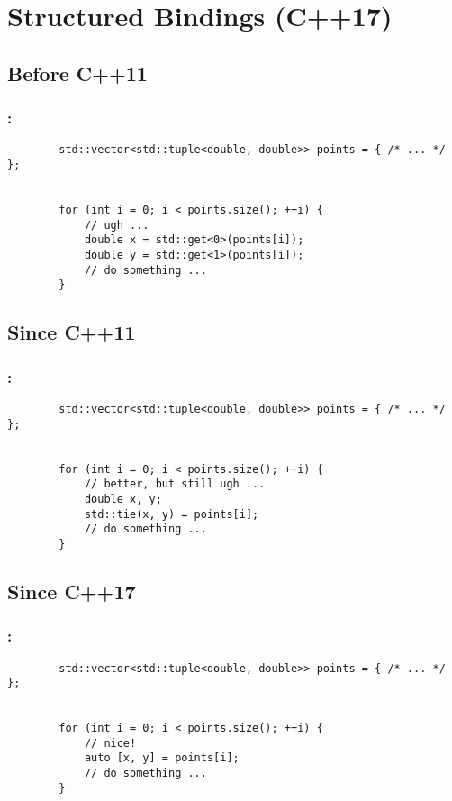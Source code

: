 \documentclass[aspectratio=43, t]{beamer}
\begin{document}
\section*{Structured Bindings (C++17)}
\subsection*{Before C++11}
\begin{frame}[fragile]
	\frametitle{\secname\footnotemark[1]{}: \subsecname}

	\begin{verbatim}
		std::vector<std::tuple<double, double>> points = { /* ... */ };


		for (int i = 0; i < points.size(); ++i) {
			// ugh ...
			double x = std::get<0>(points[i]);
			double y = std::get<1>(points[i]);
			// do something ...
		}
	\end{verbatim}
\end{frame}

\subsection*{Since C++11}
\begin{frame}[fragile]
	\frametitle{\secname: \subsecname}

	\begin{verbatim}
		std::vector<std::tuple<double, double>> points = { /* ... */ };


		for (int i = 0; i < points.size(); ++i) {
			// better, but still ugh ...
			double x, y;
			std::tie(x, y) = points[i];
			// do something ...
		}
	\end{verbatim}
\end{frame}

\subsection*{Since C++17}
\begin{frame}[fragile]
	\frametitle{\secname: \subsecname}

	\begin{verbatim}
		std::vector<std::tuple<double, double>> points = { /* ... */ };


		for (int i = 0; i < points.size(); ++i) {
			// nice!
			auto [x, y] = points[i];
			// do something ...
		}
	\end{verbatim}
\end{frame}
\end{document}
